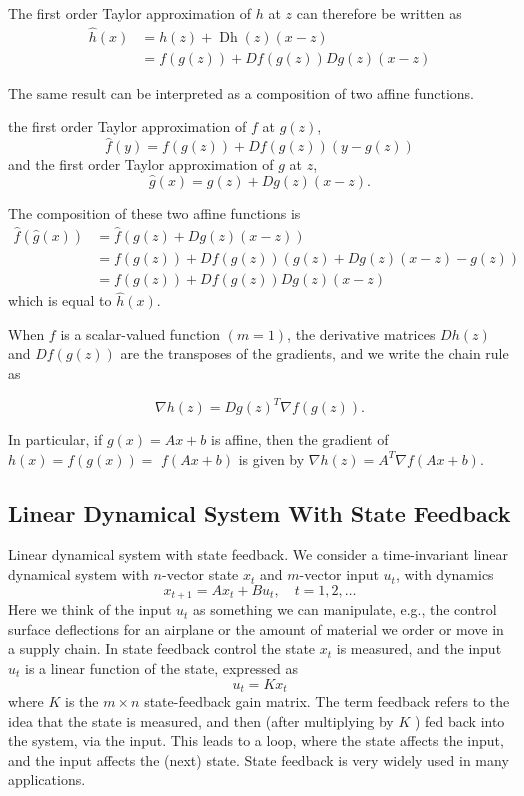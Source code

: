 \begin{corollary}
    The first order Taylor approximation of $ h $ at $ z $ can therefore be written as
$$
\begin{aligned}
\hat{h}(x) &=h(z)+\operatorname{Dh}(z)(x-z) \\
&=f(g(z))+D f(g(z)) D g(z)(x-z)
\end{aligned}
$$
\end{corollary}



The same result can be interpreted as a composition of two affine functions.


\begin{theorem}
    the first order Taylor approximation of $ f $ at $ g(z) $,
    $$
    \hat{f}(y)=f(g(z))+D f(g(z))(y-g(z))
    $$
    and the first order Taylor approximation of $ g $ at $ z $,
    $$
    \hat{g}(x)=g(z)+D g(z)(x-z) .
    $$

    The composition of these two affine functions is
$$
\begin{aligned}
\hat{f}(\hat{g}(x)) &=\hat{f}(g(z)+D g(z)(x-z)) \\
&=f(g(z))+D f(g(z))(g(z)+D g(z)(x-z)-g(z)) \\
&=f(g(z))+D f(g(z)) D g(z)(x-z)
\end{aligned}
$$
which is equal to $ \hat{h}(x) $.
\end{theorem}


When $ f $ is a scalar-valued function $ (m=1) $, the derivative matrices $ D h(z) $ and $ D f(g(z)) $ are the transposes of the gradients, and we write the chain rule as

\begin{theorem}
    $$
\nabla h(z)=D g(z)^{T} \nabla f(g(z)) .
$$
\end{theorem}


In particular, if $ g(x)=A x+b $ is affine, then the gradient of $ h(x)=f(g(x))= $ $ f(A x+b) $ is given by $ \nabla h(z)=A^{T} \nabla f(A x+b) $.

\subsection{Linear Dynamical System With State Feedback}

Linear dynamical system with state feedback. We consider a time-invariant linear dynamical system with $ n $-vector state $ x_{t} $ and $ m $-vector input $ u_{t} $, with dynamics
$$
x_{t+1}=A x_{t}+B u_{t}, \quad t=1,2, \ldots
$$
Here we think of the input $ u_{t} $ as something we can manipulate, e.g., the control surface deflections for an airplane or the amount of material we order or move in a supply chain. In state feedback control the state $ x_{t} $ is measured, and the input $ u_{t} $ is a linear function of the state, expressed as
$$
u_{t}=K x_{t}
$$
where $ K $ is the $ m \times n $ state-feedback gain matrix. The term feedback refers to the idea that the state is measured, and then (after multiplying by $ K $ ) fed back into the system, via the input. This leads to a loop, where the state affects the input, and the input affects the (next) state. State feedback is very widely used in many applications. 

